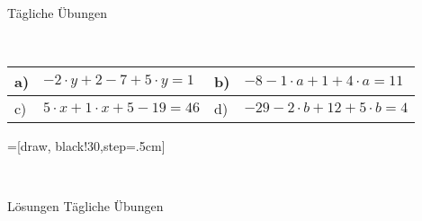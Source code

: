 \documentclass[12pt]{article}
\begin{document}
\centerline{{\Large Tägliche Übungen}} 
\vspace{1cm}
\noindent \\


\begin{xltabular}{\textwidth}{|C{0.75cm}|X|C{0.75cm}|X|}
\hline
a)&$-2\cdot y+2-7+5\cdot y=1$
&
b)&$-8-1\cdot a+1+4\cdot a=11$
\\\hline
c)&$5\cdot x+1\cdot x+5-19=46$
&
d)&$-29-2\cdot b+12+5\cdot b=4$
\\\hline
\end{xltabular}
\vspace{0.5cm}
\noindent{}=[draw, black!30,step=.5cm]
\\
\newpage
{}
\centerline{{\large Lösungen Tägliche Übungen}} 
\vspace{0.5cm}
\end{document}
